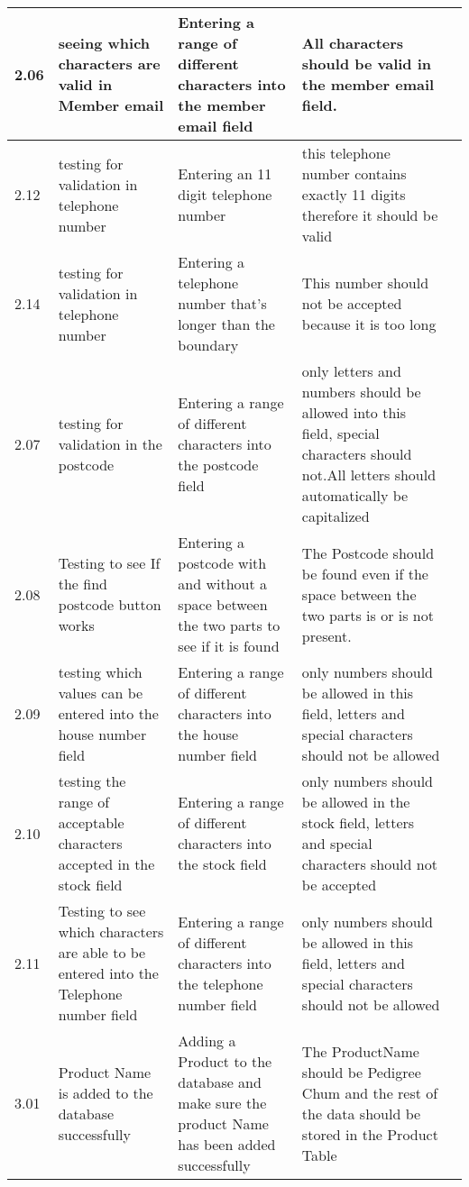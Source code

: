 \begin{flushleft}
\begin{longtable}{|p{1cm}|p{2.5cm}|p{2.5cm}|p{2cm}|p{2cm}|}
	\rowcolor{light-grey}2.06 & seeing which characters are valid in Member email & Entering a range of different characters into the member email field &  All characters should be valid in the member email field. & \\ \hline
	\rowcolor{dark-grey}2.12 & testing for validation in telephone number & Entering an 11 digit telephone number & this telephone number contains exactly 11 digits therefore it should be valid & \\ \hline
	\rowcolor{dark-grey}2.14 & testing for validation in telephone number & Entering a telephone number that's longer than the boundary & This number should not be accepted because it is too long & \\ \hline
	\rowcolor{light-grey}2.07 & testing for validation in the postcode & Entering a range of different characters into the postcode field & only letters and numbers should be allowed into this field, special characters should not.All letters should automatically be capitalized& \\ \hline
	\rowcolor{light-grey}2.08 & Testing to see If the find postcode button works & Entering a postcode with and without a space between the two parts to see if it is found &The Postcode should be found even if the space between the two parts is or is not present.& \\ \hline
	\rowcolor{light-grey}2.09 & testing which values can be entered into the house number field & Entering a range of different characters into the house number field & only numbers should be allowed in this field, letters and special characters should not be allowed & \\ \hline
	\rowcolor{light-grey}2.10 & testing the range of acceptable characters accepted in the stock field  & Entering a range of different characters into the stock field & only numbers should be allowed in the stock field, letters and special characters should not be accepted & \\ \hline
	\rowcolor{light-grey}2.11 & Testing to see which characters are able to be entered into the Telephone number field & Entering a range of different characters into the telephone number field & only numbers should be allowed in this field, letters and special characters should not be allowed & \\ \hline
	\rowcolor{dark-grey}3.01 & Product Name is added to the database successfully & Adding a Product to the database and make sure the product Name has been added successfully & The ProductName should be Pedigree Chum and the rest of the data should be stored in the Product Table & \\ \hline

\end{longtable}
\end{flushleft}
